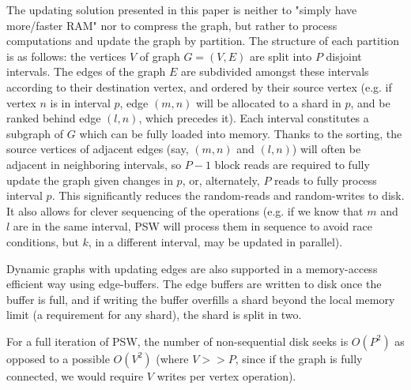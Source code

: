 The updating solution presented in this paper is neither to "simply have more/faster RAM" nor to compress the graph, but rather to process computations and update the graph by partition. The structure of each partition is as follows: the vertices $V$ of graph $G=(V,E)$ are split into $P$ disjoint intervals. The edges of the graph $E$ are subdivided amongst these intervals according to their destination vertex, and ordered by their source vertex (e.g. if vertex $n$ is in interval $p$, edge $(m,n)$ will be allocated to a shard in $p$, and be ranked behind edge $(l,n)$, which precedes it). Each interval constitutes a subgraph of $G$ which can be fully loaded into memory. Thanks to the sorting, the source vertices of adjacent edges (say, $(m,n)$ and $(l,n)$) will often be adjacent in neighboring intervals, so $P-1$ block reads are required to fully update the graph given changes in $p$, or, alternately, $P$ reads to fully process interval $p$. This significantly reduces the random-reads and random-writes to disk. It also allows for clever sequencing of the operations (e.g. if we know that $m$ and $l$ are in the same interval, PSW will process them in sequence to avoid race conditions, but $k$, in a different interval, may be updated in parallel). 

Dynamic graphs with updating edges are also supported in a memory-access efficient way using edge-buffers. The edge buffers are written to disk once the buffer is full, and if writing the buffer overfills a shard beyond the local memory limit (a requirement for any shard), the shard is split in two. 

For a full iteration of PSW, the number of non-sequential disk seeks is $O(P^2)$ as opposed to a possible $O(V^2)$ (where $V>>P$, since if the graph is fully connected, we would require $V$ writes per vertex operation).

